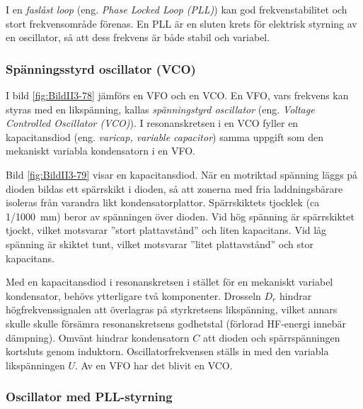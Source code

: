 I en \emph{faslåst loop} (eng. \emph{Phase Locked Loop (PLL)}) kan god
frekvenstabilitet och stort frekvensområde förenas.
En PLL är en sluten krets för elektrisk styrning av en oscillator, så att dess
frekvens är både stabil och variabel.

\subsubsection{Spänningsstyrd oscillator (VCO)}

I bild \ref{fig:BildII3-78} jämförs en VFO och en VCO.
En VFO, vars frekvens kan styras med en likspänning, kallas
\emph{spänningstyrd oscillator} (eng. \emph{Voltage Controlled Oscillator
  (VCO)}).
I resonanskretsen i en VCO fyller en kapacitansdiod (eng. \emph{varicap, variable
capacitor}) samma uppgift som den mekaniskt variabla kondensatorn i en VFO.


Bild \ref{fig:BildII3-79} visar en kapacitansdiod.
När en motriktad spänning läggs på dioden bildas ett spärrskikt i dioden,
så att zonerna med fria laddningsbärare isoleras från varandra likt
kondensatorplattor.
Spärrskiktets tjocklek (ca 1/1000~mm) beror av spänningen över dioden.
Vid hög spänning är spärrskiktet tjockt, vilket motsvarar
''stort plattavstånd'' och liten kapacitans.
Vid låg spänning är skiktet tunt, vilket motsvarar ''litet plattavstånd'' och
stor kapacitans.

Med en kapacitansdiod i resonanskretsen i stället för en mekaniskt
variabel kondensator, behövs ytterligare två komponenter.
Drosseln \(D_r\) hindrar högfrekvenssignalen att överlagras på styrkretsens
likspänning, vilket annars skulle skulle försämra resonanskretsens godhetstal 
(förlorad HF-energi innebär dämpning).
Omvänt hindrar kondensatorn \(C\) att dioden och spärrspänningen kortsluts 
genom induktorn.
Oscillatorfrekvensen ställs in med den variabla likspänningen \(U\).
Av en VFO har det blivit en VCO.

\subsubsection{Oscillator med PLL-styrning}

